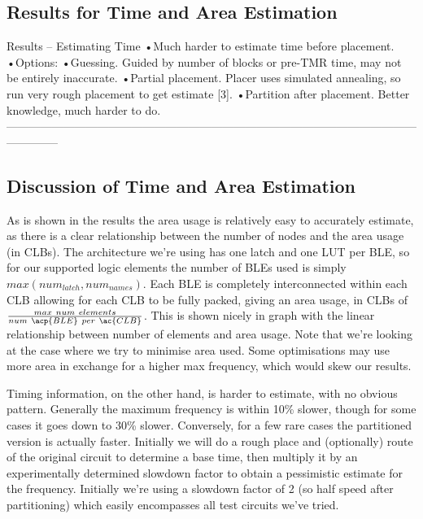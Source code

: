 \documentclass[12pt,draft,a4paper,oneside]{memoir} %
\begin{document}
\subsection{Results for Time and Area Estimation}
Results – Estimating Time
•Much harder to estimate time before placement.
•Options:
•Guessing. Guided by number of blocks or pre-TMR time, may not be entirely inaccurate.
•Partial placement. Placer uses simulated annealing, so run very rough placement to get estimate [3].
•Partition after placement. Better knowledge, much harder to do.
--------------------------------------------------------------------------------------------------------------------------
\subsection{Discussion of Time and Area Estimation}
As is shown in the results  the area usage is relatively easy to accurately estimate, as there is a clear relationship between the number of nodes and the area usage (in \acp{CLB}). The architecture we're using  has one latch and one \ac{LUT} per \ac{BLE}, so for our supported logic elements the number of \acp{BLE} used is simply $max(num_{latch}, num_{names})$. Each \ac{BLE} is completely interconnected within each \ac{CLB} allowing for each \ac{CLB} to be fully packed, giving an area usage, in \acp{CLB} of $\frac{max\ num\ elements}{num\ \acp{BLE}\ per\ \ac{CLB}}$. This is shown nicely in graph  with the linear relationship between number of elements and area usage.
Note that we're looking at the case where we try to minimise area used. Some optimisations may use more area in exchange for a higher max frequency, which would skew our results.

Timing information, on the other hand, is harder to estimate, with no obvious pattern. Generally the maximum frequency is within 10\% slower, though for some cases it goes down to 30\% slower. Conversely, for a few rare cases the partitioned version is actually faster. Initially we will do a rough place and (optionally) route of the original circuit to determine a base time, then multiply it by an experimentally determined slowdown factor to obtain a pessimistic estimate for the frequency. Initially we're using a slowdown factor of 2 (so half speed after partitioning) which easily encompasses all test circuits we've tried.
\end{document}
